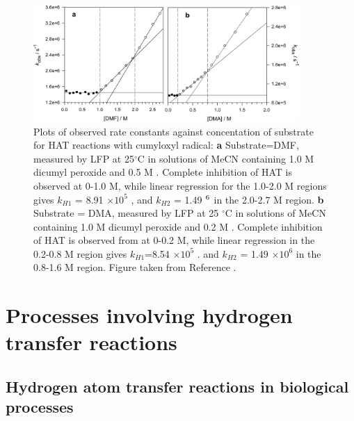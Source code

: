 
\begin{figure}[htb]
  \centering
  \includegraphics[width=0.9\textwidth]{figures/exptdmadmf}
  \caption[Plots of observed rate constants against concentration of substrate for HAT
  reactions with cumyloxyl radical.]{Plots of observed rate constants against
    concentation of substrate for HAT reactions with cumyloxyl radical: \textbf{a}
    Substrate=DMF, measured by LFP at 25$^{\circ}$C in solutions of MeCN
    containing 1.0 M dicumyl peroxide and 0.5 M . Complete inhibition
    of HAT is observed at 0-1.0 M, while linear regression for the 1.0-2.0
    M regions gives $k_{H1}$ = 8.91 $\times 10^5$ \Ms, and $k_{H2}$ = 1.49
    $\time 10^6$ \Ms in the 2.0-2.7 M region. \textbf{b} Substrate = DMA,
    measured by LFP at 25 $^{\circ}$C in solutions of MeCN containing 1.0 M
    dicumyl peroxide and 0.2 M . Complete inhibition of HAT is
    observed from at 0-0.2 M, while linear regression in the 0.2-0.8 M
    region gives $k_{H1}$=8.54 $\times 10^5$ \Ms. and $k_{H2}$ = 1.49
    $\times 10^6$ \Ms in the 0.8-1.6 M region. Figure taken from Reference
    .}
    \label{fig:expdmadmf}
\end{figure}



\newpage
\section{Processes involving hydrogen transfer reactions}

\subsection{Hydrogen atom transfer reactions in biological processes}

